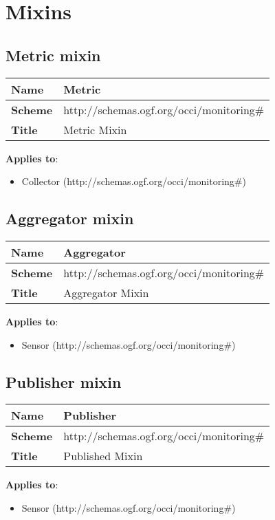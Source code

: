 \documentclass{article}
\begin{document}
\section{Mixins}
\subsection{Metric mixin}
\begin{center}
\begin{tabular}{|l|l|}
  \hline
  \textbf{Name} & Metric \\
  \hline  
  \textbf{Scheme} & http://schemas.ogf.org/occi/monitoring\# \\
  \hline
  \textbf{Title} & Metric Mixin \\
  \hline
\end{tabular}
\end{center}
\textbf{Applies to}:
\begin{itemize}
	\item Collector (http://schemas.ogf.org/occi/monitoring\#)
\end{itemize}



\subsection{Aggregator mixin}
\begin{center}
\begin{tabular}{|l|l|}
  \hline
  \textbf{Name} & Aggregator \\
  \hline  
  \textbf{Scheme} & http://schemas.ogf.org/occi/monitoring\# \\
  \hline
  \textbf{Title} & Aggregator Mixin \\
  \hline
\end{tabular}
\end{center}
\textbf{Applies to}:
\begin{itemize}
	\item Sensor (http://schemas.ogf.org/occi/monitoring\#)
\end{itemize}



\subsection{Publisher mixin}
\begin{center}
\begin{tabular}{|l|l|}
  \hline
  \textbf{Name} & Publisher \\
  \hline  
  \textbf{Scheme} & http://schemas.ogf.org/occi/monitoring\# \\
  \hline
  \textbf{Title} & Published Mixin \\
  \hline
\end{tabular}
\end{center}
\textbf{Applies to}:
\begin{itemize}
	\item Sensor (http://schemas.ogf.org/occi/monitoring\#)
\end{itemize}
\end{document}
